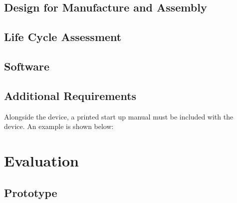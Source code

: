 \documentclass{article}
\begin{document}
\subsection{Design for Manufacture and Assembly}

\subsection{Life Cycle Assessment}

\pagebreak

\pagebreak

\pagebreak

\subsection{Software}

\pagebreak

\pagebreak




\pagebreak

\pagebreak


\pagebreak

\pagebreak

\pagebreak

\subsection{Additional Requirements}
Alongside the device, a printed start up manual must be included with the device. An example is shown below:



\pagebreak

\section{Evaluation} \label{eval}
\subsection{Prototype}

\pagebreak
\end{document}
